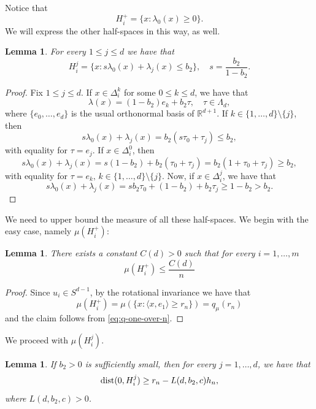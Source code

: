 \documentclass[10pt]{amsart}
\newcommand{\1}{\textbf{1}}
\newcommand{\dist}{{\rm dist}}
\numberwithin{equation}{section} %
\newtheorem{lemma}[theorem]{Lemma}
\theoremstyle{remark}
\theoremstyle{definition}
\begin{document}
Notice that \begin{equation}\label{eq:main-half-space-barycentric}H_i^+=\{x: \lambda_0(x) \geq 0\}.
\end{equation}We will express the other half-spaces in this way, as well.

\begin{lemma}\label{lem:half-spaces-barycentric}
    For every $1 \leq j \leq d$ we have that  \[H_i^j=\{x: s\lambda_0(x)+\lambda_j(x) \leq b_2\}, \quad s=\frac{b_2}{1-b_2}.\]
\end{lemma}

\begin{proof}
Fix $1 \leq j \leq d$. If $x \in 
\Delta_i^k$ for some $0 \leq k \leq d$, we have that \[\lambda(x)=(1-b_2)e_k+b_2\tau, \quad \tau \in \Lambda_d,\] where $\{e_0,\ldots,e_d
\}$ is the usual orthonormal basis of $\mathbb{R}^{d+1}$. If $k \in \{1,\ldots,d\} \setminus\{j\}$, then  \[s\lambda_0(x)+\lambda_j(x)=b_2(s\tau_0+\tau_j)\leq b_2,\] with equality for $\tau=e_j.$ If $x \in \Delta_i^0$, then \[s\lambda_0(x)+\lambda_j(x)=s(1-b_2)+b_2(\tau_0+\tau_j)=b_2(1+\tau_0+\tau_j) \geq b_2,\] with equality for $\tau=e_k, \, k \in\{1,\ldots,d\} \setminus \{j\}$. Now, if $x \in \Delta_i^j$, we have that \[s\lambda_0(x)+\lambda_j(x)=sb_2\tau_0+(1-b_2)+b_2\tau_j \geq 1-b_2>b_2.\]
\end{proof}

We need to upper bound the measure of all these half-spaces. We begin with the easy case, namely $\mu(H_i^+)$:

\begin{lemma}\label{lem:H-plus-upper-bound}
   There exists a constant $C(d)>0$ such that for every $i=1,\ldots,m$ \[\mu(H_i^+) \leq \frac{C(d)}{n}\] 
\end{lemma}

\begin{proof}
    Since $u_i \in S^{d-1}$, by the rotational invariance we have that \[\mu(H_i^+)=\mu(\{x: \langle x, e_1 \rangle \geq r_n\})=q_\mu(r_n)\] and the claim follows from \eqref{eq:q-one-over-n}.
\end{proof}

We proceed with $\mu(H_i^j)$. 

\begin{lemma}\label{lem:distance-from-origin}
    If $b_2>0$ is sufficiently small, then for every $j=1,\ldots,d$, we have that \[\dist(0,H_i^j) \geq r_n-L(d,b_2,c)h_n,\] where $L(d,b_2,c)>0$.
\end{lemma}
\end{document}
